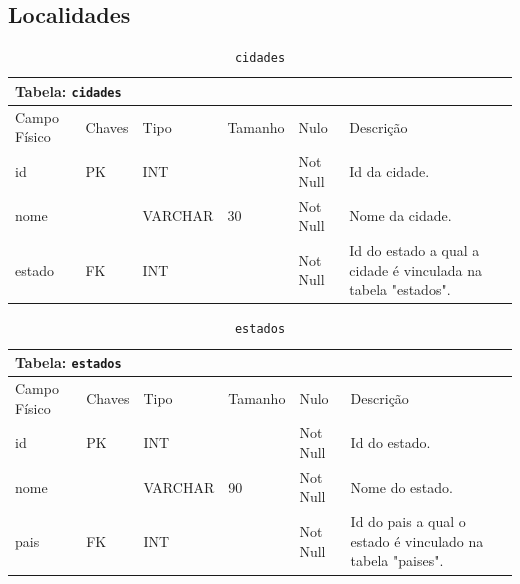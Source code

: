 \documentclass[12pt,a4paper]{article}
\begin{document}
\subsection{Localidades}


\begin{center}
\begin{table}[h!]
	\caption{\texttt{cidades}}
	\label{tabela:cidades}
	\begin{tabular}{|p{2.5cm}|p{1cm}|p{1.25cm}|p{1.75cm}|p{1.25cm}|p{5cm}|}\hline	
		\multicolumn{6}{|p{16cm}|}{\cellcolor{cinzaClaro}  \centering Tabela: \texttt{cidades}} \\ \hline %
		{\small Campo Físico}   & {\small Chaves} & {\small Tipo} & {\small Tamanho} & {\small Nulo} & {\small Descrição}\\\hline %
		
		{\tiny id} & {\tiny PK} & {\tiny INT} & {\tiny } & {\tiny Not Null} &{\tiny Id da cidade.}\\\hline
		{\tiny nome} & {\tiny } & {\tiny VARCHAR} & {\tiny 30} & {\tiny Not Null} &{\tiny Nome da cidade.}\\\hline
		{\tiny estado} & {\tiny FK} & {\tiny INT} & {\tiny } & {\tiny Not Null} &{\tiny Id do estado a qual a cidade é vinculada na tabela "estados".}\\\hline
		
			
	\end{tabular}
\end{table}	
\end{center}

\begin{center}
\begin{table}[h!]
	\caption{\texttt{estados}}
	\label{tabela:estados}
	\begin{tabular}{|p{2.5cm}|p{1cm}|p{1.25cm}|p{1.75cm}|p{1.25cm}|p{6cm}|}\hline	
		\multicolumn{6}{|p{16cm}|}{\cellcolor{cinzaClaro}  \centering Tabela: \texttt{estados}} \\ \hline %
		{\small Campo Físico}   & {\small Chaves} & {\small Tipo} & {\small Tamanho} & {\small Nulo} & {\small Descrição}\\\hline %
		
		{\tiny id} & {\tiny PK} & {\tiny INT} & {\tiny } & {\tiny Not Null} &{\tiny Id do estado.}\\\hline
		{\tiny nome} & {\tiny } & {\tiny VARCHAR} & {\tiny 90} & {\tiny Not Null} &{\tiny Nome do estado.}\\\hline
		{\tiny pais} & {\tiny FK} & {\tiny INT} & {\tiny } & {\tiny Not Null} &{\tiny Id do pais a qual o estado é vinculado na tabela "paises".}\\\hline
			
	\end{tabular}
\end{table}	
\end{center}
\end{document}
